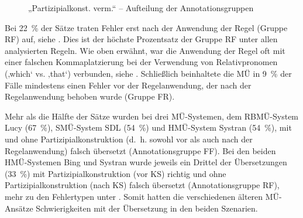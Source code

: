 \begin{figure}

\caption{\label{fig:05:75}„Partizipialkonst. verm.“ -- Aufteilung der Annotationsgruppen   }
\end{figure}

Bei 22~\% der Sätze traten Fehler erst nach der Anwendung der Regel (Gruppe RF) auf, siehe . Dies ist der höchste Prozentsatz der Gruppe RF unter allen analysierten Regeln. Wie oben erwähnt, war die Anwendung der Regel oft mit einer falschen Kommaplatzierung bei der Verwendung von Relativpronomen (‚which‘ vs. ‚that‘) verbunden, siehe . Schließlich beinhaltete die MÜ in 9~\% der Fälle mindestens einen Fehler vor der Regelanwendung, der nach der Regelanwendung behoben wurde (Gruppe FR).


Mehr als die Hälfte der Sätze wurden bei drei MÜ-Systemen, dem RBMÜ-System Lucy (67~\%), SMÜ-System SDL (54~\%) und HMÜ-System Systran (54~\%), mit und ohne Partizipialkonstruktion (d.~h. sowohl vor als auch nach der Regelanwendung) falsch übersetzt (Annotationsgruppe FF). Bei den beiden HMÜ-Systemen Bing und Systran wurde jeweils ein Drittel der Übersetzungen (33~\%) mit Partizipialkonstruktion (vor KS) richtig und ohne Partizipialkonstruktion (nach KS) falsch übersetzt (Annotationsgruppe RF), mehr zu den Fehlertypen unter . Somit hatten die verschiedenen älteren MÜ-Ansätze Schwierigkeiten mit der Übersetzung in den beiden Szenarien.


